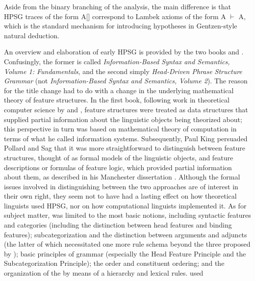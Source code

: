 \documentclass[output=paper,biblatex,babelshorthands,newtxmath,draftmode,colorlinks,citecolor=brown]{langscibook}
\begin{document}
\noindent
Aside from the binary branching of the \citeauthor{Lambek1958} analysis, the main difference is that HPSG traces of
the form A[\slasch {}] correspond
to Lambek axioms of the form A $\vdash$ A, which is the standard mechanism for introducing hypotheses in Gentzen-style natural deduction.

An overview and elaboration of early HPSG is provided by the two books \citet{ps} and
\citet{ps2}. Confusingly, the former is called \textit{Information-Based Syntax and Semantics,
  Volume 1: Fundamentals}, and the second simply \textit{Head-Driven Phrase Structure Grammar} (not
\textit{Information-Based Syntax and Semantics, Volume 2}). The reason for the title change had to
do with a change in the underlying mathematical theory of feature structures. In the first book,
following work in theoretical computer science by \citet{RoundsKasper1986} and
\citet{MoshierRounds1987}, feature structures were treated as data structures that supplied partial
information about the linguistic objects being theorized about; this perspective in turn was based
on  mathematical theory of computation in terms of what he called information
systems. Subsequently, Paul King persuaded Pollard and Sag that it was more
straightforward to distinguish between feature structures, thought of as formal models of the
linguistic objects, and feature descriptions or formulas of feature logic,
which provided partial information about them, as described in his Manchester dissertation
\citep{King89}.  Although the formal issues involved in distinguishing between the two approaches
are of interest in their own right, they seem not to have had a lasting effect on how theoretical
linguists used HPSG, nor on how computational linguists implemented it. As for subject matter,
\citet{ps} was limited to the most basic notions, including syntactic features and categories
(including the distinction between head features and binding features); subcategorization and the
distinction between arguments and adjuncts (the latter of which necessitated one more rule schema
beyond the three proposed by \citealt{Pollard85a-u}); basic principles of grammar (especially the
Head Feature Principle and the Subcategorization Principle); the  order
and constituent ordering; and the organization of the  by
means of a  hierarchy and lexical rules. \citet{ps2} used
\end{document}
